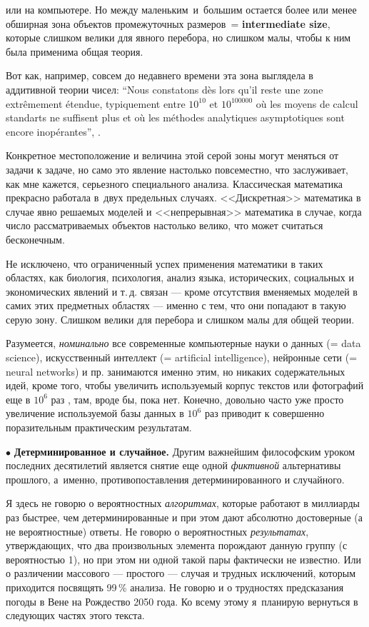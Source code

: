 \documentclass[intlimits,twoside,a4paper,11pt]{article}
\begin{document}
		или на компьютере. Но между маленьким~и~большим остается более или
		менее обширная зона объектов промежуточных размеров~= {\bf intermediate size}, 
		которые слишком велики для явного перебора, но слишком малы, 
		чтобы к ним была применима общая теория.
		\par
		Вот как, например, совсем до недавнего времени эта зона выглядела в
		аддитивной теории чисел:
		``Nous constatons d\`es lors qu’il reste une zone extr\^emement \'etendue,
		typiquement entre $10^{10}$ et $10^{100 000}$ o\`u les moyens de calcul standarts ne
		suffisent plus et o\`u les m\'ethodes analytiques asymptotiques sont encore
		inop\'erantes'', \cite{R}.
		\par
		Конкретное местоположение и величина этой серой зоны могут меняться от 
		задачи к задаче, но само это явление настолько повсеместно, что заслуживает,
		как мне кажется, серьезного специального анализа. Классическая математика прекрасно 
		работала в~двух предельных случаях. <<Дискретная>> математика в случае явно 
		решаемых моделей и <<непрерывная>> математика в случае, когда число
		рассматриваемых объектов настолько велико, что может считаться бесконечным.
		
		
		Не исключено, что ограниченный успех применения математики в таких
		областях, как биология, психология, анализ языка, исторических, социальных 
		и экономических 
		явлений и т.\,д. связан --- кроме отсутствия вменяемых моделей в самих этих
		предметных областях --- именно с тем, что они попадают в такую серую
		зону. Слишком велики для перебора и слишком малы для общей теории.
		
		Разумеется, {\it номинально\/} все современные компьютерные науки о данных 
		(= data science), искусственный интеллект (= artificial intelligence), нейронные
		сети (= neural networks) и пр. занимаются
		именно этим, но никаких содержательных %
		идей, кроме того, чтобы увеличить используемый корпус текстов или фотографий
		еще в $10^6$ раз \cite{HNP}, там, вроде бы, пока нет. Конечно, довольно 
		часто уже просто увеличение используемой базы данных в $10^6$ раз приводит 
		к совершенно поразительным практическим результатам.
		
		\par\smallskip
		$\bullet$ {\bf Детерминированное и случайное.} Другим важнейшим 
		философским уроком последних десятилетий является снятие еще
		одной {\it фиктивной\/} альтернативы прошлого, а~именно, 
		противопоставления детерминированного и случайного.
		
		Я здесь не говорю о вероятностных {\it алгоритмах\/}, которые работают в
		миллиарды раз быстрее, чем детерминированные и при этом дают абсолютно
		достоверные (а не вероятностные) ответы. Не говорю о вероятностных 
		{\it результатах\/}, утверждающих, что два произвольных элемента порождают 
		данную группу (с вероятностью 1), но при этом ни одной такой пары
		фактически не известно. Или о различении массового --- простого ---
		случая и трудных исключений, которым приходится посвящять 99\,\% 
		анализа. Не говорю и о трудностях предсказания погоды в Вене на 
		Рождество 2050 года. Ко всему этому я~планирую вернуться в следующих 
		частях этого текста.
		
\end{document}
